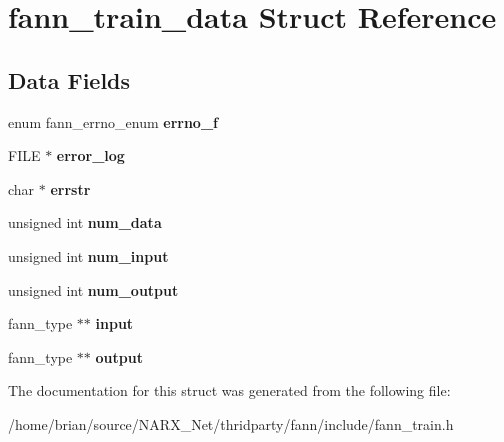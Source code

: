 \hypertarget{structfann__train__data}{\section{fann\-\_\-train\-\_\-data Struct Reference}
\label{structfann__train__data}
}
\subsection*{Data Fields}
\begin{DoxyCompactItemize}
\item 
\hypertarget{structfann__train__data_a5b46be6dfa18da5620d4ce1b8654f0af}{enum fann\-\_\-errno\-\_\-enum {\bfseries errno\-\_\-f}}\label{structfann__train__data_a5b46be6dfa18da5620d4ce1b8654f0af}

\item 
\hypertarget{structfann__train__data_a0942b9a4f7a184e9d6b95901e2b9ba4f}{F\-I\-L\-E $\ast$ {\bfseries error\-\_\-log}}\label{structfann__train__data_a0942b9a4f7a184e9d6b95901e2b9ba4f}

\item 
\hypertarget{structfann__train__data_ac3a29d5a3e50771c8ce7cf18bc093a6e}{char $\ast$ {\bfseries errstr}}\label{structfann__train__data_ac3a29d5a3e50771c8ce7cf18bc093a6e}

\item 
\hypertarget{structfann__train__data_ac5af0baeb6872def9464f4226ecff2c4}{unsigned int {\bfseries num\-\_\-data}}\label{structfann__train__data_ac5af0baeb6872def9464f4226ecff2c4}

\item 
\hypertarget{structfann__train__data_ac3550a2f70842a7cc82b298046f8dc8a}{unsigned int {\bfseries num\-\_\-input}}\label{structfann__train__data_ac3550a2f70842a7cc82b298046f8dc8a}

\item 
\hypertarget{structfann__train__data_ae9c0749c170ed297771c94f797bc232f}{unsigned int {\bfseries num\-\_\-output}}\label{structfann__train__data_ae9c0749c170ed297771c94f797bc232f}

\item 
\hypertarget{structfann__train__data_ae43aefaf1f13f0da71b29860ae9b0226}{fann\-\_\-type $\ast$$\ast$ {\bfseries input}}\label{structfann__train__data_ae43aefaf1f13f0da71b29860ae9b0226}

\item 
\hypertarget{structfann__train__data_a2660e223019a5355dfef9fa4f774a9fc}{fann\-\_\-type $\ast$$\ast$ {\bfseries output}}\label{structfann__train__data_a2660e223019a5355dfef9fa4f774a9fc}

\end{DoxyCompactItemize}


The documentation for this struct was generated from the following file\-:\begin{DoxyCompactItemize}
\item 
/home/brian/source/\-N\-A\-R\-X\-\_\-\-Net/thridparty/fann/include/fann\-\_\-train.\-h\end{DoxyCompactItemize}
